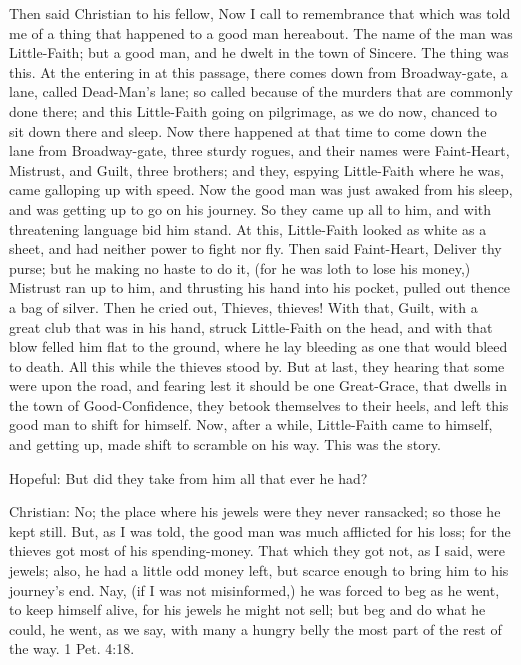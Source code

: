 Then said Christian to his fellow, Now I call to remembrance that which was told me of a thing that happened to a good man hereabout. The name of the man was Little-Faith; but a good man, and he dwelt in the town of Sincere. The thing was this. At the entering in at this passage, there comes down from Broadway-gate, a lane, called Dead-Man's lane; so called because of the murders that are commonly done there; and this Little-Faith going on pilgrimage, as we do now, chanced to sit down there and sleep. Now there happened at that time to come down the lane from Broadway-gate, three sturdy rogues, and their names were Faint-Heart, Mistrust, and Guilt, three brothers; and they, espying Little-Faith where he was, came galloping up with speed. Now the good man was just awaked from his sleep, and was getting up to go on his journey. So they came up all to him, and with threatening language bid him stand. At this, Little-Faith looked as white as a sheet, and had neither power to fight nor fly. Then said Faint-Heart, Deliver thy purse; but he making no haste to do it, (for he was loth to lose his money,) Mistrust ran up to him, and thrusting his hand into his pocket, pulled out thence a bag of silver. Then he cried out, Thieves, thieves! With that, Guilt, with a great club that was in his hand, struck Little-Faith on the head, and with that blow felled him flat to the ground, where he lay bleeding as one that would bleed to death. All this while the thieves stood by. But at last, they hearing that some were upon the road, and fearing lest it should be one Great-Grace, that dwells in the town of Good-Confidence, they betook themselves to their heels, and left this good man to shift for himself. Now, after a while, Little-Faith came to himself, and getting up, made shift to scramble on his way. This was the story.

Hopeful: But did they take from him all that ever he had?

Christian: No; the place where his jewels were they never ransacked; so those he kept still. But, as I was told, the good man was much afflicted for his loss; for the thieves got most of his spending-money. That which they got not, as I said, were jewels; also, he had a little odd money left, but scarce enough to bring him to his journey's end. Nay, (if I was not misinformed,) he was forced to beg as he went, to keep himself alive, for his jewels he might not sell; but beg and do what he could, he went, as we say, with many a hungry belly the most part of the rest of the way. 1 Pet. 4:18.

